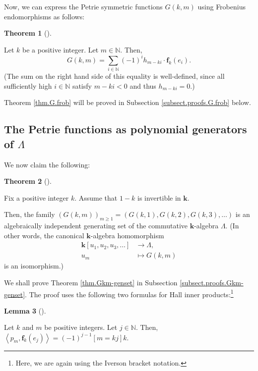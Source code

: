 \documentclass[numbers=enddot,12pt,final,onecolumn,notitlepage]{scrartcl}%
\theoremstyle{definition}
\newtheorem{theo}{Theorem}[section]
\newenvironment{theorem}[1][]
{\begin{theo}[#1]\begin{leftbar}}
{\end{leftbar}\end{theo}}
\newtheorem{lem}[theo]{Lemma}
\newenvironment{lemma}[1][]
{\begin{lem}[#1]\begin{leftbar}}
{\end{leftbar}\end{lem}}
\let\sumnonlimits\sum
\renewcommand{\sum}{\sumnonlimits\limits}
\begin{document}
Now, we can express the Petrie symmetric functions $G\left(  k,m\right)  $
using Frobenius endomorphisms as follows:

\begin{theorem}
\label{thm.G.frob}Let $k$ be a positive integer. Let $m\in\mathbb{N}$. Then,%
\[
G\left(  k,m\right)  =\sum_{i\in\mathbb{N}}\left(  -1\right)  ^{i}%
h_{m-ki}\cdot\mathbf{f}_{k}\left(  e_{i}\right)  .
\]
(The sum on the right hand side of this equality is well-defined, since all
sufficiently high $i\in\mathbb{N}$ satisfy $m-ki<0$ and thus $h_{m-ki}=0$.)
\end{theorem}

Theorem \ref{thm.G.frob} will be proved in Subsection
\ref{subsect.proofs.G.frob} below.

\subsection{\label{subsect.thms.genset}The Petrie functions as polynomial
generators of $\Lambda$}

We now claim the following:

\begin{theorem}
\label{thm.Gkm-genset}Fix a positive integer $k$. Assume that $1-k$ is
invertible in $\mathbf{k}$.

Then, the family $\left(  G\left(  k,m\right)  \right)  _{m\geq1}=\left(
G\left(  k,1\right)  ,G\left(  k,2\right)  ,G\left(  k,3\right)
,\ldots\right)  $ is an algebraically independent generating set of the
commutative $\mathbf{k}$-algebra $\Lambda$. (In other words, the canonical
$\mathbf{k}$-algebra homomorphism
\begin{align*}
\mathbf{k}\left[  u_{1},u_{2},u_{3},\ldots\right]   &  \rightarrow\Lambda,\\
u_{m}  &  \mapsto G\left(  k,m\right)
\end{align*}
is an isomorphism.)
\end{theorem}

We shall prove Theorem \ref{thm.Gkm-genset} in Subsection
\ref{subsect.proofs.Gkm-genset}. The proof uses the following two formulas for
Hall inner products:\footnote{Here, we are again using the Iverson bracket
notation.}

\begin{lemma}
\label{lem.hall-hfep}Let $k$ and $m$ be positive integers. Let $j\in
\mathbb{N}$. Then, $\left\langle p_{m},\mathbf{f}_{k}\left(  e_{j}\right)
\right\rangle =\left(  -1\right)  ^{j-1}\left[  m=kj\right]  k$.
\end{lemma}
\end{document}
